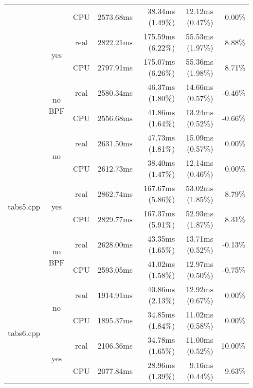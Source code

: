 \documentclass[en]{pracamgr}
\begin{document}
\begin{small}
\begin{longtable}{|l|c|c|r|r|r|r|}
                            &                         & CPU  & 2573.68ms & 38.34ms (1.49\%) & 12.12ms (0.47\%) & 0.00\% \\*
                            \cline{2-7}
                            & \multirow{2}{*}{yes}    & real & 2822.21ms & 175.59ms (6.22\%) & 55.53ms (1.97\%) & 8.88\% \\*
                            &                         & CPU  & 2797.91ms & 175.07ms (6.26\%) & 55.36ms (1.98\%) & 8.71\% \\*
                            \cline{2-7}
                            & \multirow{2}{*}{no BPF} & real & 2580.34ms & 46.37ms (1.80\%) & 14.66ms (0.57\%) & -0.46\% \\*
                            &                         & CPU  & 2556.68ms & 41.86ms (1.64\%) & 13.24ms (0.52\%) & -0.66\% \\
\hline
\multirow{6}{*}{tabs5.cpp}  & \multirow{2}{*}{no}     & real & 2631.50ms & 47.73ms (1.81\%) & 15.09ms (0.57\%) & 0.00\% \\*
                            &                         & CPU  & 2612.73ms & 38.40ms (1.47\%) & 12.14ms (0.46\%) & 0.00\% \\*
                            \cline{2-7}
                            & \multirow{2}{*}{yes}    & real & 2862.74ms & 167.67ms (5.86\%) & 53.02ms (1.85\%) & 8.79\% \\*
                            &                         & CPU  & 2829.77ms & 167.37ms (5.91\%) & 52.93ms (1.87\%) & 8.31\% \\*
                            \cline{2-7}
                            & \multirow{2}{*}{no BPF} & real & 2628.00ms & 43.35ms (1.65\%) & 13.71ms (0.52\%) & -0.13\% \\*
                            &                         & CPU  & 2593.05ms & 41.02ms (1.58\%) & 12.97ms (0.50\%) & -0.75\% \\
\hline
\multirow{6}{*}{tabs6.cpp}  & \multirow{2}{*}{no}     & real & 1914.91ms & 40.86ms (2.13\%) & 12.92ms (0.67\%) & 0.00\% \\*
                            &                         & CPU  & 1895.37ms & 34.85ms (1.84\%) & 11.02ms (0.58\%) & 0.00\% \\*
                            \cline{2-7}
                            & \multirow{2}{*}{yes}    & real & 2106.36ms & 34.78ms (1.65\%) & 11.00ms (0.52\%) & 10.00\% \\*
                            &                         & CPU  & 2077.84ms & 28.96ms (1.39\%) & 9.16ms (0.44\%) & 9.63\% \\*

\end{longtable}
\end{small}
\end{document}
